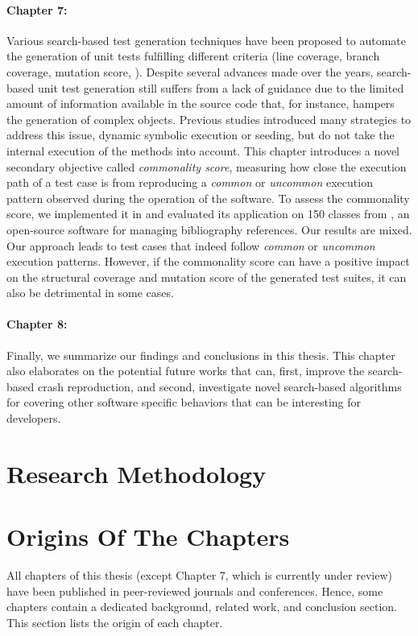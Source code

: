 \paragraph{Chapter 7:}%
Various search-based test generation techniques have been proposed to automate the generation of unit tests fulfilling different criteria (\eg line coverage, branch coverage, mutation score, \etc). Despite several advances made over the years, search-based unit test generation still suffers from a lack of guidance due to the limited amount of information available in the source code that, for instance, hampers the generation of complex objects. Previous studies introduced many strategies to address this issue, \eg dynamic symbolic execution or seeding, but do not take the internal execution of the methods into account.  
This chapter introduces a novel secondary objective called \emph{commonality score}, measuring how close the execution path of a test case is from reproducing a \emph{common} or \emph{uncommon} execution pattern observed during the operation of the software.
To assess the commonality score, we implemented it in \evosuite and evaluated its application on 150 classes from \jabref, an open-source software for managing bibliography references. 
Our results are mixed. Our approach leads to test cases that indeed follow \emph{common} or \emph{uncommon} execution patterns. However, if the commonality score can have a positive impact on the structural coverage and mutation score of the generated test suites, it can also be detrimental in some cases. 

\paragraph{Chapter 8:} 
Finally, we summarize our findings and conclusions in this thesis. This chapter also elaborates on the potential future works that can, first, improve the search-based crash reproduction, and second, investigate novel search-based algorithms for covering other software specific behaviors that can be interesting for developers.


\section{Research Methodology}




\section{Origins Of The Chapters}
All chapters of this thesis (except Chapter 7, which is currently under review) have been published in peer-reviewed journals and conferences. 
Hence, some chapters contain a dedicated background, related work, and conclusion section. 
This section lists the origin of each chapter.

